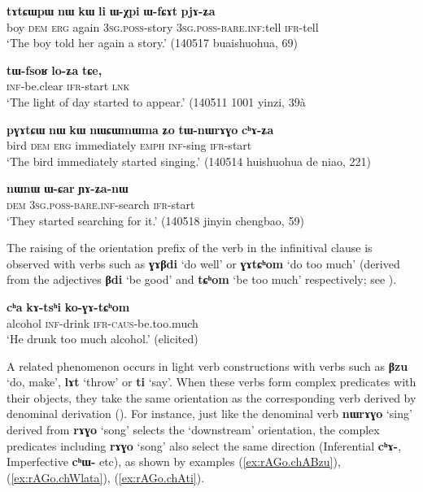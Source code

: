 \documentclass[oneside,a4paper,11pt]{article}
\newcommand{\ipa}[1]{\textbf{\phon#1}} %
\newcommand{\jpg}[2]{\ipa{#1} `#2'} %
\newcommand{\refb}[1]{(\ref{#1})}
\begin{document}
\begin{exe}
\ex \label{ex:pjAZa}
\gll
\ipa{tɤtɕɯpɯ} 	\ipa{nɯ} 	\ipa{kɯ} 	\ipa{li} \ipa{ɯ-χpi} 	\ipa{ɯ-fɕɤt} 	\ipa{pjɤ-ʑa} \\
boy \textsc{dem} \textsc{erg} again \textsc{3sg.poss}-story \textsc{3sg.poss-bare.inf}:tell \textsc{ifr}-tell \\
\glt `The boy told her again a story.' (140517 buaishuohua, 69)
\end{exe}

\begin{exe}
\ex \label{ex:loZa}
\gll
\ipa{tɯ-fsoʁ} 	\ipa{lo-ʑa} 	\ipa{tɕe,} \\
\textsc{inf}-be.clear \textsc{ifr}-start \textsc{lnk} \\
\glt `The light of day started to appear.' (140511 1001 yinzi, 39à
\end{exe}

\begin{exe}
\ex \label{ex:chAZa}
\gll \ipa{pɣɤtɕɯ} 	\ipa{nɯ} 	\ipa{kɯ} 	\ipa{nɯɕɯmɯma} 	\ipa{ʑo} 	\ipa{tɯ-nɯrɤɣo} 	\ipa{cʰɤ-ʑa} \\
bird \textsc{dem} \textsc{erg} immediately \textsc{emph} \textsc{inf}-sing \textsc{ifr}-start \\
\glt `The bird immediately started singing.' (140514 huishuohua de niao, 221)
\end{exe}

\begin{exe}
\ex \label{ex:YAZa}
\gll
\ipa{nɯnɯ} 	\ipa{ɯ-ɕar} 	\ipa{ɲɤ-ʑa-nɯ} \\
\textsc{dem} \textsc{3sg.poss-bare.inf}-search \textsc{ifr}-start \\
\glt `They started searching for it.' (140518 jinyin chengbao, 59)
\end{exe}

The raising of the orientation prefix of the verb in the infinitival clause is observed with verbs such as \jpg{ɣɤβdi}{do well} or \jpg{ɣɤtɕʰom}{do too much} (derived from the adjectives \jpg{βdi}{be good} and \jpg{tɕʰom}{be too much} respectively; see \citealt[184]{jacques15causative}).

\begin{exe}
\ex 
\gll \ipa{cʰa} 	\ipa{kɤ-tsʰi} 	\ipa{ko-ɣɤ-tɕʰom} \\
alcohol \textsc{inf}-drink \textsc{ifr-caus}-be.too.much \\
\glt `He drunk too much alcohol.' (elicited)
\end{exe}

A related phenomenon occurs in light verb constructions with verbs such as \jpg{βzu}{do, make}, \jpg{lɤt}{throw} or \jpg{ti}{say}. When these verbs form complex predicates with their objects, they take the same orientation as the corresponding verb derived by denominal derivation (\citealt[1220]{jacques12incorp}). For instance, just like the denominal verb \jpg{nɯrɤɣo}{sing} derived from \jpg{rɤɣo}{song} selects the `downstream' orientation, the complex predicates including \jpg{rɤɣo}{song} also select the same direction (Inferential \ipa{cʰɤ-}, Imperfective \ipa{cʰɯ-} etc), as shown by examples \refb{ex:rAGo.chABzu}, \refb{ex:rAGo.chWlata}, \refb{ex:rAGo.chAti}.
\end{document}
